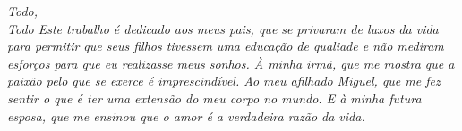 
\begin{dedicatoria}

    \vspace*{\fill}
    \centering
    \noindent
    \textit{\lang
    {
        Todo, \\
        Todo
    }
    {
      Este trabalho é dedicado aos meus pais, que
      se privaram de luxos da vida para permitir
      que seus filhos tivessem uma educação de qualiade e
      não mediram esforços para que eu realizasse
      meus sonhos. À minha irmã, que me mostra que a
      paixão pelo que se exerce é imprescindível.
      Ao meu afilhado Miguel, que me fez sentir o que é
      ter uma extensão do meu corpo no mundo. E à minha
      futura esposa, que me ensinou que o amor é a verdadeira
      razão da vida.
    }}
    \vspace*{\fill}

\end{dedicatoria}


